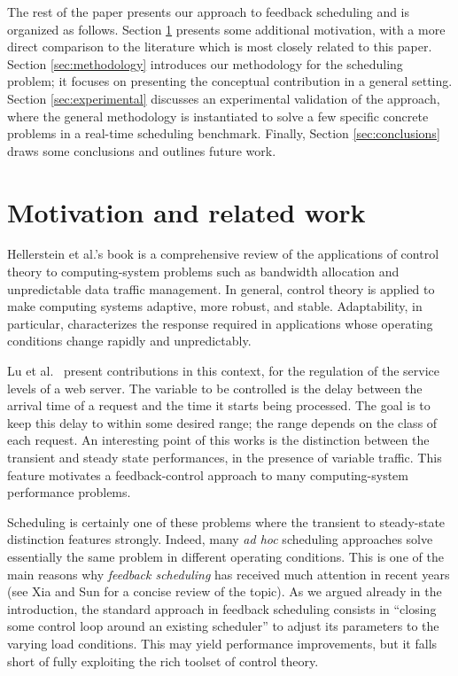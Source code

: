 \documentclass[a4paper]{article}
\begin{document}
The rest of the paper presents our approach to feedback scheduling and is
organized as follows. Section \ref{sec:motivations} presents some additional
motivation, with a more direct comparison to the literature which is most 
closely related to this paper. Section \ref{sec:methodology} introduces our 
methodology for the scheduling problem; it focuses on presenting the conceptual 
contribution in a general setting. Section \ref{sec:experimental} discusses an 
experimental validation of the approach, where the general methodology is 
instantiated to solve a few specific concrete problems in a real-time 
scheduling benchmark. Finally, Section \ref{sec:conclusions} draws some 
conclusions and outlines future work.

\section{Motivation and related work}
\label{sec:motivations}

Hellerstein et al.'s book \cite{HellersteinEtAl-2004a} is a comprehensive
review of the applications of control theory to computing-system
problems such as bandwidth allocation and unpredictable data traffic management.
In general, control theory is applied to make computing systems adaptive, more 
robust, and stable. Adaptability, in particular, characterizes the response 
required in applications whose operating conditions change rapidly and
unpredictably.

Lu et al.~\cite{LuEtAl-2001a,LuEtAl-2006a} present contributions in this 
context, for the regulation of the service levels of a web server. 
The variable to be controlled is the delay between the arrival time of a request
and the time it starts being processed. The goal is to keep this delay to within
some desired range; the range depends on the class of each request.
An interesting point of this works is the distinction between
the transient and steady state performances, in the presence of variable
traffic. This feature motivates a feedback-control approach to
many computing-system performance problems.

Scheduling is certainly one of these problems where the transient to steady-state 
distinction features strongly. Indeed, many \emph{ad hoc} scheduling approaches
solve essentially the same problem in different operating conditions.
This is one of the main reasons why \emph{feedback scheduling} has received 
much attention in recent years (see Xia and Sun \cite{XiaSun-2006a} for a 
concise review of the topic). As we argued already in the introduction, the 
standard approach in feedback scheduling consists in ``closing some control 
loop around an existing scheduler'' to adjust its parameters to the varying 
load conditions. This may yield performance improvements, but it falls short 
of fully exploiting the rich toolset of control theory.
\end{document}
